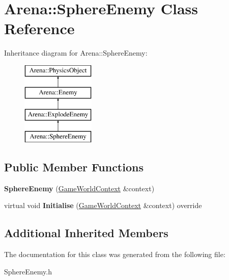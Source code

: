 \hypertarget{class_arena_1_1_sphere_enemy}{\section{Arena\+:\+:Sphere\+Enemy Class Reference}
\label{class_arena_1_1_sphere_enemy}
}
Inheritance diagram for Arena\+:\+:Sphere\+Enemy\+:\begin{figure}[H]
\begin{center}
\leavevmode
\includegraphics[height=4.000000cm]{class_arena_1_1_sphere_enemy}
\end{center}
\end{figure}
\subsection*{Public Member Functions}
\begin{DoxyCompactItemize}
\item 
\hypertarget{class_arena_1_1_sphere_enemy_afb1445426be5c294be848e9d627b51e1}{{\bfseries Sphere\+Enemy} (\hyperlink{struct_arena_1_1_game_world_context}{Game\+World\+Context} \&context)}\label{class_arena_1_1_sphere_enemy_afb1445426be5c294be848e9d627b51e1}

\item 
\hypertarget{class_arena_1_1_sphere_enemy_a12a48daff3a153062d19ffcdf8b5e2e4}{virtual void {\bfseries Initialise} (\hyperlink{struct_arena_1_1_game_world_context}{Game\+World\+Context} \&context) override}\label{class_arena_1_1_sphere_enemy_a12a48daff3a153062d19ffcdf8b5e2e4}

\end{DoxyCompactItemize}
\subsection*{Additional Inherited Members}


The documentation for this class was generated from the following file\+:\begin{DoxyCompactItemize}
\item 
Sphere\+Enemy.\+h\end{DoxyCompactItemize}
